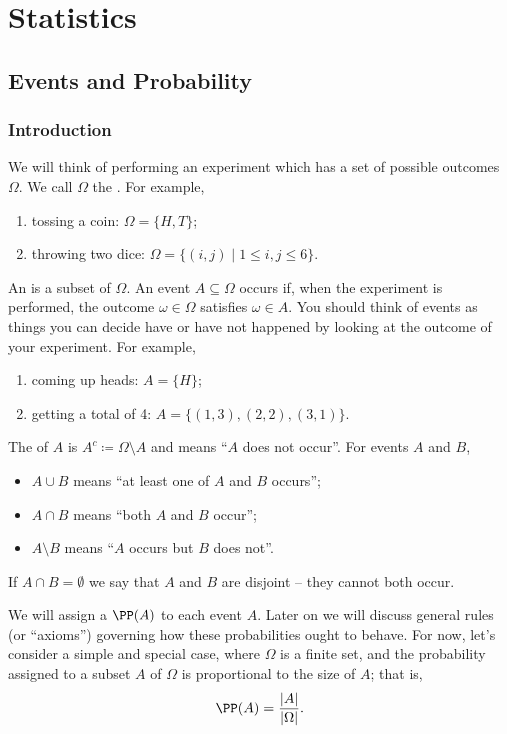 \part{Statistics}
\chapter{Events and Probability}
\section{Introduction}
We will think of performing an experiment which has a set of possible outcomes $\Omega$. We call $\Omega$ the . For example,
\begin{enumerate}[label=(\alph*)]
\item tossing a coin: $\Omega=\{H,T\}$;
\item throwing two dice: $\Omega=\{(i,j)\mid1\le i,j\le 6\}$.
\end{enumerate}

An  is a subset of $\Omega$. An event $A\subseteq\Omega$ occurs if, when the experiment is performed, the outcome $\omega\in\Omega$ satisfies $\omega\in A$. You should think of events as things you can decide have or have not happened by looking at the outcome of your experiment. For example,
\begin{enumerate}[label=(\alph*)]
\item coming up heads: $A=\{H\}$;
\item getting a total of 4: $A=\{(1,3),(2,2),(3,1)\}$.
\end{enumerate}

The  of $A$ is $A^c\coloneqq \Omega\setminus A$ and means ``$A$ does not occur''. For events $A$ and $B$,

\begin{itemize}
\item $A\cup B$ means ``at least one of $A$ and $B$ occurs'';
\item $A\cap B$ means ``both $A$ and $B$ occur'';
\item $A\setminus B$ means ``$A$ occurs but $B$ does not''.
\end{itemize}

If $A\cap B=\emptyset$ we say that $A$ and $B$ are disjoint -- they cannot both occur.

We will assign a  $\PP(A)$ to each event $A$. Later on we will discuss general rules (or ``axioms'') governing how these probabilities ought to behave. For now, let’s consider a simple and special case, where $\Omega$ is a finite set, and the probability assigned to a subset $A$ of $\Omega$ is proportional to the size of $A$; that is,
\[ \PP(A)=\frac{|A|}{|\Omega|}. \]

